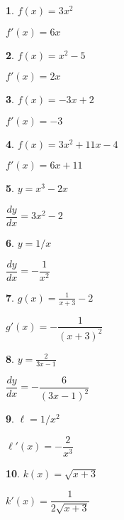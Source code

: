 \documentclass{amsbook}
\newtheorem{exc}{}
\newenvironment{ex}{\begin{exc}\normalfont}{\end{exc}}
\numberwithin{section}{chapter}
\numberwithin{equation}{chapter}
\newcommand{\ds}{\displaystyle}
\begin{document}
\begin{multicols}{2}

\begin{ex}
	$f(x) = 3x^2$
	\begin{sol}
		$f'(x)=6x$
	\end{sol}
\end{ex}

\begin{ex}
	$f(x) = x^2-5$
	\begin{sol}
		$f'(x)=2x$
	\end{sol}
\end{ex}

\begin{ex}
	$f(x) = -3x+2$
	\begin{sol}
		$f'(x)=-3$
	\end{sol}
\end{ex}

\begin{ex}
	$f(x) = 3x^2+11x-4$
	\begin{sol}
		$f'(x)=6x+11$
	\end{sol}
\end{ex}


\begin{ex}
$y = x^3-2x$
	\begin{sol}
$\dfrac{dy}{dx} = 3x^2-2$
	\end{sol}
\end{ex}

\begin{ex}
	$y = 1/x$
	\begin{sol}
			$\dfrac{dy}{dx} = -\dfrac{1}{x^2}$
	\end{sol}
\end{ex}

\begin{ex}
	 $g(x) = \ds \frac{1}{x+3}-2$
	\begin{sol}
		$g'(x) = -\dfrac{1}{(x+3)^2}$
	\end{sol}
\end{ex}

\begin{ex}
	$y = \ds \frac{2}{3x-1}$
	\begin{sol}
		$ \dfrac{dy}{dx} = -\dfrac{6}{(3x-1)^2} $
	\end{sol}
\end{ex}

\begin{ex}
 $\ell = 1/x^2$
	\begin{sol}
$\ell'(x) = -\dfrac{2}{x^3}$
	\end{sol}
\end{ex}

\begin{ex}
	$k(x) = \sqrt{x+3}$
	\begin{sol}
		$k'(x) = \dfrac{1}{2\sqrt{x+3}}$
	\end{sol}
\end{ex}

\end{multicols}
\end{document}
